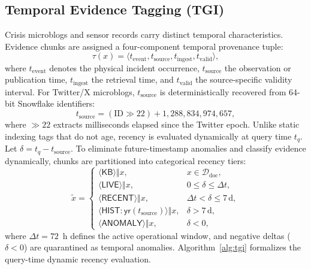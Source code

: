 \documentclass[conference]{IEEEtran}
\begin{document}
\subsection{Temporal Evidence Tagging (TGI)}
Crisis microblogs and sensor records carry distinct temporal characteristics. Evidence chunks are assigned a four-component temporal provenance tuple:
\begin{equation}
\tau(x) = \langle t_{\mathrm{event}}, t_{\mathrm{source}}, t_{\mathrm{ingest}}, t_{\mathrm{valid}} \rangle,
\label{eq:tuple}
\end{equation}
where $t_{\mathrm{event}}$ denotes the physical incident occurrence, $t_{\mathrm{source}}$ the observation or publication time, $t_{\mathrm{ingest}}$ the retrieval time, and $t_{\mathrm{valid}}$ the source-specific validity interval. For Twitter/X microblogs, $t_{\mathrm{source}}$ is deterministically recovered from 64-bit Snowflake identifiers:
\begin{equation}
t_{\mathrm{source}} = (\mathrm{ID} \gg 22) + 1{,}288{,}834{,}974{,}657,
\label{eq:snow}
\end{equation}
where $\gg 22$ extracts milliseconds elapsed since the Twitter epoch. Unlike static indexing tags that do not age, recency is evaluated dynamically at query time $t_q$. Let $\delta = t_q - t_{\mathrm{source}}$. To eliminate future-timestamp anomalies and classify evidence dynamically, chunks are partitioned into categorical recency tiers:
\begin{equation}
\tilde{x} =
\begin{cases}
\langle\mathsf{KB}\rangle \Vert x, & x \in \mathcal{D}_{\mathrm{doc}},\\[2pt]
\langle\mathsf{LIVE}\rangle \Vert x, & 0 \le \delta \le \Delta t,\\[2pt]
\langle\mathsf{RECENT}\rangle \Vert x, & \Delta t < \delta \le 7\,\text{d},\\[2pt]
\langle\mathsf{HIST:yr}(t_{\mathrm{source}})\rangle \Vert x, & \delta > 7\,\text{d},\\[2pt]
\langle\mathsf{ANOMALY}\rangle \Vert x, & \delta < 0,
\end{cases}
\label{eq:tgi}
\end{equation}
where $\Delta t = 72$~h defines the active operational window, and negative deltas ($\delta < 0$) are quarantined as temporal anomalies. Algorithm~\ref{alg:tgi} formalizes the query-time dynamic recency evaluation.
\end{document}
